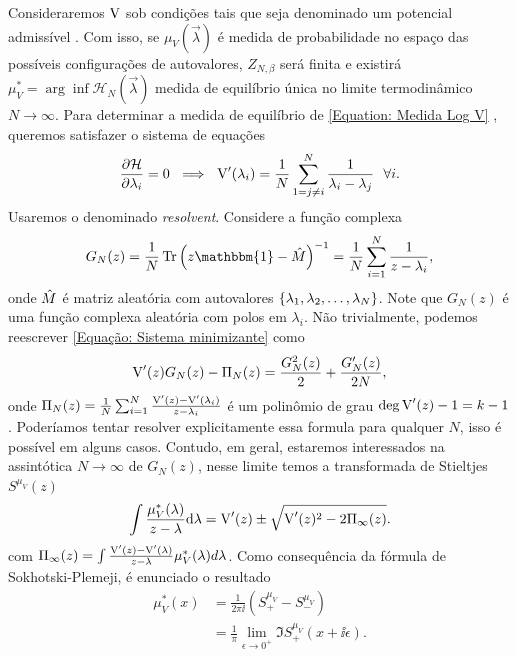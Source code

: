 \documentclass[12pt]{report}
\begin{document}
Consideraremos $\operatorname{V}$ sob condições tais que seja denominado um potencial admissível \cite{ChafaCoulombMeasure}. Com isso, se $\mu_{V}(\vec{\lambda})$ é medida de probabilidade no espaço das possíveis configurações de autovalores, $Z_{N, \beta}$ será finita e existirá $\mu_{V}^* = \arg \inf {\mathcal{H}_N(\vec{\lambda})}$ medida de equilíbrio única no limite termodinâmico $N \rightarrow \infty$. Para determinar a medida de equilíbrio de \ref{Equation: Medida Log V} \cite{RMT-firstcourse-Potters}, queremos satisfazer o sistema de equações
\begin{equation}
	\frac{\partial \mathcal{H}}{\partial \lambda_i} = 0 \ \implies \ \operatorname{V}'(\lambda_i) = \frac{1}{N} \sum_{1 = j \neq i}^{N} \frac{1}{\lambda_i - \lambda_j} \ \ \forall i.
	\label{Equação: Sistema minimizante}
\end{equation} 
Usaremos o denominado \textit{resolvent}. Considere a função complexa $$G_N(z) = \frac{1}{N} \Tr{\left(z \mathbbm{1} - \matriz{M}\right)^{-1}} = \frac{1}{N} \sum_{i=1}^{N} \frac{1}{z - \lambda_i},$$ onde $\hat M$ é matriz aleatória com autovalores $\{\lambda_1, \lambda_2, \dots, \lambda_N\}$. Note que $G_N(z)$ é uma função complexa aleatória com polos em $\lambda_i$. Não trivialmente, podemos reescrever \ref{Equação: Sistema minimizante} como $$\operatorname{V}'(z) G_N(z) - \Pi_N(z) = \frac{G_N^2(z)}{2} + \frac{G'_N(z)}{2N},$$ onde $\Pi_N(z) = \frac{1}{N} \sum_{i = 1}^{N} \frac{\operatorname{V}'(z) - \operatorname{V}'(\lambda_i)}{z - \lambda_i}$ é um polinômio de grau $\deg{\operatorname{V}'(z)} - 1 = k - 1$. Poderíamos tentar resolver explicitamente essa formula para qualquer $N$, isso é possível em alguns casos. Contudo, em geral, estaremos interessados na assintótica $N \to \infty$ de $G_N(z)$, nesse limite temos a transformada de Stieltjes $S^{\mu_V}(z)$
\begin{equation}
	\int \frac{\mu^*_V(\lambda)}{z - \lambda} \mathrm{d} \lambda= \operatorname{V}'(z) \pm \sqrt{\operatorname{V}'(z)^2 - 2 \Pi_{\infty}(z) }.
	\label{Equation: Resolvent}
\end{equation}
com $\Pi_{\infty}(z) = \int \frac{\operatorname{V}'(z) - \operatorname{V}'(\lambda)}{z - \lambda} \mu^*_V(\lambda) d\lambda$. Como consequência da fórmula de Sokhotski-Plemeji, é enunciado o resultado 
\begin{equation}
	\begin{split}
		\mu^{*}_{V}(x) 
		&= \frac{1}{2\pi \ii} \left( S^{\mu_V}_{+} -  S^{\mu_V}_{-}\right) \\
		&= \frac{1}{\pi} \lim_{\epsilon \to 0^+} \Im{S^{\mu_V}_{+}(x + \ii\epsilon)}.
	\end{split}
	\label{Equation: p(lambda)}
\end{equation}
\end{document}
